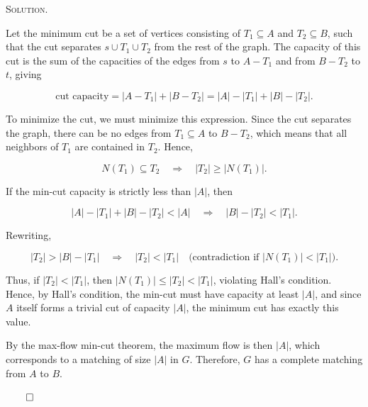 \documentclass[12pt, a4paper, oneside]{ctexart}
\newenvironment{solution}{%
	\par\noindent\textsc{Solution. }\ignorespaces
}{%
	\hfill$\qed$\par
}
\begin{document}
\begin{solution}
		Let the minimum cut be a set of vertices consisting of \( T_1 \subseteq A \) and \( T_2 \subseteq B \), such that the cut separates \( s \cup T_1 \cup T_2 \) from the rest of the graph. The capacity of this cut is the sum of the capacities of the edges from \( s \) to \( A - T_1 \) and from \( B - T_2 \) to \( t \), giving
		
		\[
		\text{cut capacity} = |A - T_1| + |B - T_2| = |A| - |T_1| + |B| - |T_2|.
		\]
		
		To minimize the cut, we must minimize this expression. Since the cut separates the graph, there can be no edges from \( T_1 \subseteq A \) to \( B - T_2 \), which means that all neighbors of \( T_1 \) are contained in \( T_2 \). Hence,
		
		\[
		N(T_1) \subseteq T_2 \quad \Rightarrow \quad |T_2| \geq |N(T_1)|.
		\]
		
		If the min-cut capacity is strictly less than \( |A| \), then
		
		\[
		|A| - |T_1| + |B| - |T_2| < |A| \quad \Rightarrow \quad |B| - |T_2| < |T_1|.
		\]
		
		Rewriting,
		
		\[
		|T_2| > |B| - |T_1| \quad \Rightarrow \quad |T_2| < |T_1| \quad \text{(contradiction if } |N(T_1)| < |T_1|).
		\]
		
		Thus, if \( |T_2| < |T_1| \), then \( |N(T_1)| \leq |T_2| < |T_1| \), violating Hall's condition. Hence, by Hall's condition, the min-cut must have capacity at least \( |A| \), and since \( A \) itself forms a trivial cut of capacity \( |A| \), the minimum cut has exactly this value.
		
		By the max-flow min-cut theorem, the maximum flow is then \( |A| \), which corresponds to a matching of size \( |A| \) in \( G \). Therefore, \( G \) has a complete matching from \( A \) to \( B \).
		
	\end{solution}
\end{document}

